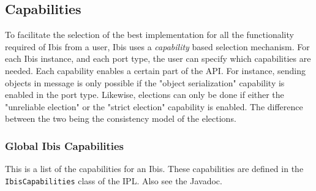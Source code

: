 \documentclass[10pt]{article}
\begin{document}
\subsection{Capabilities}

To facilitate the selection of the best implementation for all the
functionality required of Ibis from a user, Ibis uses a
\emph{capability} based selection mechanism. For each Ibis instance, and
each port type, the user can specify which capabilities are needed. Each
capability enables a certain part of the API. For instance, sending
objects in message is only possible if the "object serialization"
capability is enabled in the port type. Likewise, elections can only be
done if either the "unreliable election" or the "strict election"
capability is enabled. The difference between the two being the
consistency model of the elections. 

\subsubsection{Global Ibis Capabilities}

This is a list of the capabilities for an Ibis. These capabilities are
defined in the \texttt{IbisCapabilities} class of the IPL. Also see the
Javadoc.  
\end{document}

